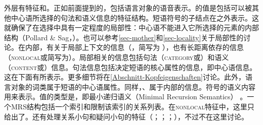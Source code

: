 \z
外层有特征\phonc 和\synsemc。正如前面提到的，\phonc 包括语言对象的语音表示。\synsemc 的值是包括可以被其他中心语所选择的句法和语义信息的特征结构。短语符号的子结点在\synsemc 之外表示。这就确保了在选择中具有一定程度的局部性：中心语不能进入它所选择的元素的内部结构（Pollard \& Sag\citeyear[--145]{ps}，\citeyear[]{ps2}）。也可以参考\ref{sec-mother}和\ref{sec-locality}关于局部性的讨论。在\synsemc 内部，有关于局部上下文的信息（\localc，简写为\loc
），也有长距离依存的信息（\textsc{nonlocal}或简写为\nonlocc）。局部相关的信息包括句法（\textsc{category}或\catc）和语义（\textsc{content}或\contc）信息。句法信息包括决定短语的核心属性的信息，即中心语信息。这在\headc 下面有所表示。更多细节将在\ref{Abschnitt-Kopfeigenschaften}讨论。此外，语言对象的词类属于短语的中心语属性。同样，\headc、\subcatc 属于\catc 内部的信息。符号的语义内容用\contc 来表示。\contc 值的类型是，即最小递归语义（Minimal Recursion Semantics）\indexmrsc
\citep*{CFPS2005a}。一个MRS结构包括一个索引和限制该索引的关系列表。在\textsc{nonlocal}特征中，这里只给出了\slasch 。还有处理关系小句和疑问小句的特征（\citealp{ps2}；\citealp{Sag97a}；\citealp{GSag2000a-u}；\citealp{Holler2005a-u}），不过不在这里讨论。
